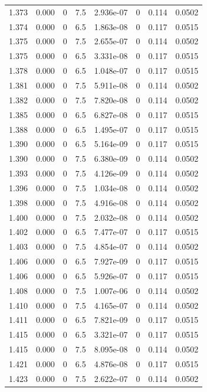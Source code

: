\documentclass[preview]{standalone}
\begin{document}
{{{{{{{{{{{{{{{{\begin{tabular}{L{1.2cm}C{1.2cm} C{0.3cm}C{0.5cm} C{1.4cm}C{1.4cm} C{1.4cm}C{1.4cm}}
  1.373  &  0.000  & 0     & 7.5 &  2.936e-07  & 0  & 0.114 &  0.0502   \\ 
  1.374  &  0.000  & 0     & 6.5 &  1.863e-08  & 0  & 0.117 &  0.0515   \\ 
  1.375  &  0.000  & 0     & 7.5 &  2.655e-07  & 0  & 0.114 &  0.0502   \\ 
  1.375  &  0.000  & 0     & 6.5 &  3.331e-08  & 0  & 0.117 &  0.0515   \\ 
  1.378  &  0.000  & 0     & 6.5 &  1.048e-07  & 0  & 0.117 &  0.0515   \\ 
  1.381  &  0.000  & 0     & 7.5 &  5.911e-08  & 0  & 0.114 &  0.0502   \\ 
  1.382  &  0.000  & 0     & 7.5 &  7.820e-08  & 0  & 0.114 &  0.0502   \\ 
  1.385  &  0.000  & 0     & 6.5 &  6.827e-08  & 0  & 0.117 &  0.0515   \\ 
  1.388  &  0.000  & 0     & 6.5 &  1.495e-07  & 0  & 0.117 &  0.0515   \\ 
  1.390  &  0.000  & 0     & 6.5 &  5.164e-09  & 0  & 0.117 &  0.0515   \\ 
  1.390  &  0.000  & 0     & 7.5 &  6.380e-09  & 0  & 0.114 &  0.0502   \\ 
  1.393  &  0.000  & 0     & 7.5 &  4.126e-09  & 0  & 0.114 &  0.0502   \\ 
  1.396  &  0.000  & 0     & 7.5 &  1.034e-08  & 0  & 0.114 &  0.0502   \\ 
  1.398  &  0.000  & 0     & 7.5 &  4.916e-08  & 0  & 0.114 &  0.0502   \\ 
  1.400  &  0.000  & 0     & 7.5 &  2.032e-08  & 0  & 0.114 &  0.0502   \\ 
  1.402  &  0.000  & 0     & 6.5 &  7.477e-07  & 0  & 0.117 &  0.0515   \\ 
  1.403  &  0.000  & 0     & 7.5 &  4.854e-07  & 0  & 0.114 &  0.0502   \\ 
  1.406  &  0.000  & 0     & 6.5 &  7.927e-09  & 0  & 0.117 &  0.0515   \\ 
  1.406  &  0.000  & 0     & 6.5 &  5.926e-07  & 0  & 0.117 &  0.0515   \\ 
  1.408  &  0.000  & 0     & 7.5 &  1.007e-06  & 0  & 0.114 &  0.0502   \\ 
  1.410  &  0.000  & 0     & 7.5 &  4.165e-07  & 0  & 0.114 &  0.0502   \\ 
  1.411  &  0.000  & 0     & 6.5 &  7.821e-09  & 0  & 0.117 &  0.0515   \\ 
  1.415  &  0.000  & 0     & 6.5 &  3.321e-07  & 0  & 0.117 &  0.0515   \\ 
  1.415  &  0.000  & 0     & 7.5 &  8.095e-08  & 0  & 0.114 &  0.0502   \\ 
  1.421  &  0.000  & 0     & 6.5 &  4.876e-08  & 0  & 0.117 &  0.0515   \\ 
  1.423  &  0.000  & 0     & 7.5 &  2.622e-07  & 0  & 0.114 &  0.0502   \\ 
\hline 
\end{tabular} 

}}}}}}}}}}}}}}}}
\end{document}
